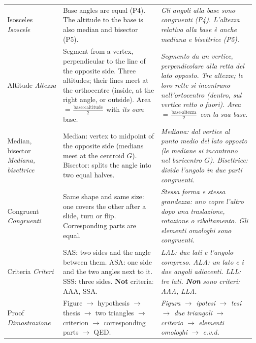 {\begin{tabularx}{\textwidth}{@{}>{\bfseries\color{navy}\raggedright\arraybackslash}p{2.1cm} >{\raggedright\arraybackslash}X >{\raggedright\arraybackslash\itshape\leavevmode\color{itgreen}}X@{}}
Isosceles \newline \textit{Isoscele} &
Base angles are equal (P4). The altitude to the base is also median and bisector (P5). &
Gli angoli alla base sono congruenti (P4). L'altezza relativa alla base è anche mediana e bisettrice (P5).\\
Altitude \newline \textit{Altezza} &
Segment from a vertex, perpendicular to the line of the opposite side. Three altitudes; their lines meet at the orthocentre (inside, at the right angle, or outside). Area $= \frac{\text{base} \times \text{altitude}}{2}$ with \emph{its own} base. &
Segmento da un vertice, perpendicolare alla retta del lato opposto. Tre altezze; le loro rette si incontrano nell'ortocentro (dentro, sul vertice retto o fuori). Area $= \frac{\text{base} \cdot \text{altezza}}{2}$ con la \emph{sua} base.\\
Median, bisector \newline \textit{Mediana, bisettrice} &
Median: vertex to midpoint of the opposite side (medians meet at the centroid $G$). Bisector: splits the angle into two equal halves. &
Mediana: dal vertice al punto medio del lato opposto (le mediane si incontrano nel baricentro $G$). Bisettrice: divide l'angolo in due parti congruenti.\\
Congruent \newline \textit{Congruenti} &
Same shape and same size: one covers the other after a slide, turn or flip. Corresponding parts are equal. &
Stessa forma e stessa grandezza: uno copre l'altro dopo una traslazione, rotazione o ribaltamento. Gli elementi omologhi sono congruenti.\\
Criteria \newline \textit{Criteri} &
SAS: two sides and the angle between them. ASA: one side and the two angles next to it. SSS: three sides. \textbf{Not} criteria: AAA, SSA. &
LAL: due lati e l'angolo compreso. ALA: un lato e i due angoli adiacenti. LLL: tre lati. \textbf{\upshape Non} sono criteri: AAA, LLA.\\
Proof \newline \textit{Dimostrazione} &
Figure $\to$ hypothesis $\to$ thesis $\to$ two triangles $\to$ criterion $\to$ corresponding parts $\to$ QED. &
Figura $\to$ ipotesi $\to$ tesi $\to$ due triangoli $\to$ criterio $\to$ elementi omologhi $\to$ c.v.d.\\
\bottomrule
\end{tabularx}
}

